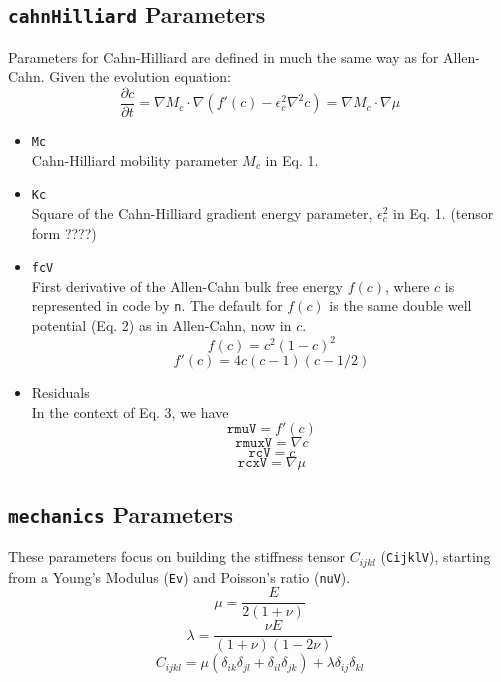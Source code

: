 \documentclass[11pt]{article} %
\begin{document}
\subsection{\texttt{cahnHilliard} Parameters}
Parameters for Cahn-Hilliard are defined in much the same way as for Allen-Cahn.
Given the evolution equation:
\begin{equation}
\frac{\partial c}{\partial t} = \nabla M_c \cdot \nabla \left( f'(c) - \epsilon_c^2 \nabla^2 c \right) = \nabla M_c \cdot \nabla \mu
\end{equation}
\begin{itemize}
\item \texttt{Mc} \\
	Cahn-Hilliard mobility parameter $M_c$ in Eq. 1.
\item \texttt{Kc} \\
	Square of the Cahn-Hilliard gradient energy parameter, $\epsilon_c^2$ in Eq. 1.  (tensor form ????)
\item \texttt{fcV} \\
	First derivative of the Allen-Cahn bulk free energy $f(c)$, where $c$ is represented in code by \texttt{n}.  The default for $f(c)$ is the same double well 			potential (Eq. 2) as in Allen-Cahn, now in $c$.
	\[ f(c) = c^2 (1-c)^2 \]
	\[ f'(c) = 4c (c -1)(c - 1/2) \]
\item Residuals \\
	In the context of Eq. 3, we have
	\[ \texttt{rmuV} = f'(c) \]
	\[ \texttt{rmuxV} = \nabla c \]
	\[ \texttt{rcV} = c \]
	\[ \texttt{rcxV} = \nabla \mu \]
\end{itemize}


\subsection{\texttt{mechanics} Parameters}
These parameters focus on building the stiffness tensor $C_{ijkl}$ (\texttt{CijklV}), starting from a Young's Modulus (\texttt{Ev}) and Poisson's ratio (\texttt{nuV}).
\[ \mu = \frac{E}{2(1+\nu)} \]
\[ \lambda = \frac{\nu E}{(1+\nu)(1-2\nu)} \]
\[ C_{ijkl} = \mu (\delta_{ik} \delta_{jl}+\delta_{il} \delta_{jk}) + \lambda \delta_{ij} \delta_{kl} \]

\end{document}
